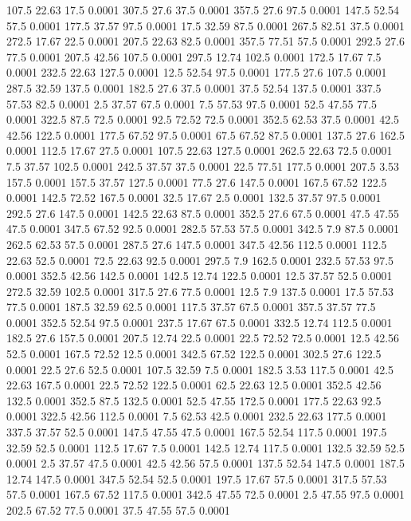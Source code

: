 107.5	22.63	17.5	0.0001
307.5	27.6	37.5	0.0001
357.5	27.6	97.5	0.0001
147.5	52.54	57.5	0.0001
177.5	37.57	97.5	0.0001
17.5	32.59	87.5	0.0001
267.5	82.51	37.5	0.0001
272.5	17.67	22.5	0.0001
207.5	22.63	82.5	0.0001
357.5	77.51	57.5	0.0001
292.5	27.6	77.5	0.0001
207.5	42.56	107.5	0.0001
297.5	12.74	102.5	0.0001
172.5	17.67	7.5	0.0001
232.5	22.63	127.5	0.0001
12.5	52.54	97.5	0.0001
177.5	27.6	107.5	0.0001
287.5	32.59	137.5	0.0001
182.5	27.6	37.5	0.0001
37.5	52.54	137.5	0.0001
337.5	57.53	82.5	0.0001
2.5	37.57	67.5	0.0001
7.5	57.53	97.5	0.0001
52.5	47.55	77.5	0.0001
322.5	87.5	72.5	0.0001
92.5	72.52	72.5	0.0001
352.5	62.53	37.5	0.0001
42.5	42.56	122.5	0.0001
177.5	67.52	97.5	0.0001
67.5	67.52	87.5	0.0001
137.5	27.6	162.5	0.0001
112.5	17.67	27.5	0.0001
107.5	22.63	127.5	0.0001
262.5	22.63	72.5	0.0001
7.5	37.57	102.5	0.0001
242.5	37.57	37.5	0.0001
22.5	77.51	177.5	0.0001
207.5	3.53	157.5	0.0001
157.5	37.57	127.5	0.0001
77.5	27.6	147.5	0.0001
167.5	67.52	122.5	0.0001
142.5	72.52	167.5	0.0001
32.5	17.67	2.5	0.0001
132.5	37.57	97.5	0.0001
292.5	27.6	147.5	0.0001
142.5	22.63	87.5	0.0001
352.5	27.6	67.5	0.0001
47.5	47.55	47.5	0.0001
347.5	67.52	92.5	0.0001
282.5	57.53	57.5	0.0001
342.5	7.9	87.5	0.0001
262.5	62.53	57.5	0.0001
287.5	27.6	147.5	0.0001
347.5	42.56	112.5	0.0001
112.5	22.63	52.5	0.0001
72.5	22.63	92.5	0.0001
297.5	7.9	162.5	0.0001
232.5	57.53	97.5	0.0001
352.5	42.56	142.5	0.0001
142.5	12.74	122.5	0.0001
12.5	37.57	52.5	0.0001
272.5	32.59	102.5	0.0001
317.5	27.6	77.5	0.0001
12.5	7.9	137.5	0.0001
17.5	57.53	77.5	0.0001
187.5	32.59	62.5	0.0001
117.5	37.57	67.5	0.0001
357.5	37.57	77.5	0.0001
352.5	52.54	97.5	0.0001
237.5	17.67	67.5	0.0001
332.5	12.74	112.5	0.0001
182.5	27.6	157.5	0.0001
207.5	12.74	22.5	0.0001
22.5	72.52	72.5	0.0001
12.5	42.56	52.5	0.0001
167.5	72.52	12.5	0.0001
342.5	67.52	122.5	0.0001
302.5	27.6	122.5	0.0001
22.5	27.6	52.5	0.0001
107.5	32.59	7.5	0.0001
182.5	3.53	117.5	0.0001
42.5	22.63	167.5	0.0001
22.5	72.52	122.5	0.0001
62.5	22.63	12.5	0.0001
352.5	42.56	132.5	0.0001
352.5	87.5	132.5	0.0001
52.5	47.55	172.5	0.0001
177.5	22.63	92.5	0.0001
322.5	42.56	112.5	0.0001
7.5	62.53	42.5	0.0001
232.5	22.63	177.5	0.0001
337.5	37.57	52.5	0.0001
147.5	47.55	47.5	0.0001
167.5	52.54	117.5	0.0001
197.5	32.59	52.5	0.0001
112.5	17.67	7.5	0.0001
142.5	12.74	117.5	0.0001
132.5	32.59	52.5	0.0001
2.5	37.57	47.5	0.0001
42.5	42.56	57.5	0.0001
137.5	52.54	147.5	0.0001
187.5	12.74	147.5	0.0001
347.5	52.54	52.5	0.0001
197.5	17.67	57.5	0.0001
317.5	57.53	57.5	0.0001
167.5	67.52	117.5	0.0001
342.5	47.55	72.5	0.0001
2.5	47.55	97.5	0.0001
202.5	67.52	77.5	0.0001
37.5	47.55	57.5	0.0001
